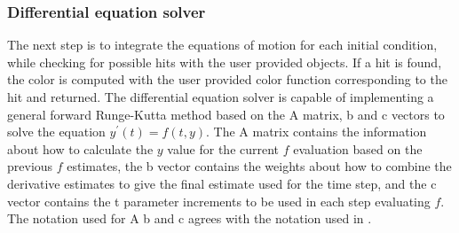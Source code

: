 \documentclass[pdftex,12pt,a4paper]{article}
\begin{document}
	\subsubsection{Differential equation solver}
		The next step is to integrate the equations of motion for each initial condition, while checking for possible hits with the user provided objects. If a hit is found, the color is computed with the user provided color function corresponding to the hit and returned. The differential equation solver is capable of implementing a general forward Runge-Kutta method based on the A matrix, b and c vectors to solve the equation $y^\prime(t) = f(t, y)$. The A matrix contains the information about how to calculate the $y$ value for the current $f$ evaluation based on the previous $f$ estimates, the b vector contains the weights about how to combine the derivative estimates to give the final estimate used for the time step, and the c vector contains the t parameter increments to be used in each step evaluating $f$. The notation used for A b and c agrees with the notation used in \cite{recipies}.
\end{document}
